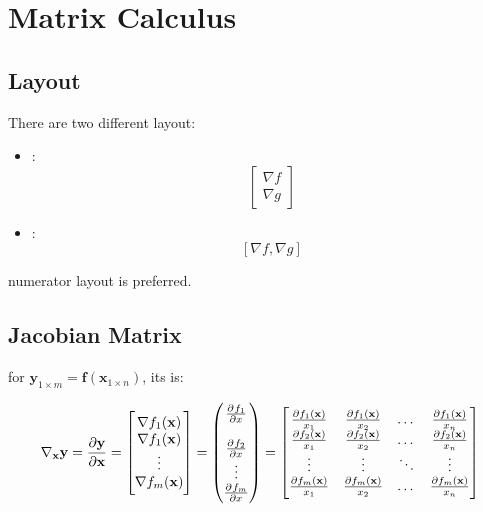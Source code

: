 \section{Matrix Calculus}

\subsection{Layout}


There are two different layout:

\begin{itemize}
	\item {}:
		\begin{equation}
		\left [
		\begin{matrix}
		\nabla f \\
		\nabla g
		\end{matrix}
		\right ]
		\end{equation}
	\item {}:
	\begin{equation}
	\left [
	\nabla f ,	\nabla g	\right ]
	\end{equation}
\end{itemize}

numerator layout is preferred.


\subsection{Jacobian Matrix}
for $\mathbf{y}_{1 \times m} = \mathbf{f}(\mathbf{x}_{1 \times n})$, its  is:

\begin{equation}
	\nabla{}_{\mathbf{x}} \mathbf{y} = 
\frac{\partial \mathbf{y}}{\partial \mathbf{x}} = \left [ \begin{matrix}
	\nabla f_1 (\mathbf{x}) \\
	\nabla f_1 (\mathbf{x}) \\
	\vdots \\
	\nabla f_m (\mathbf{x})  
\end{matrix} \right ] = \begin{pmatrix}
    \pd{f_1}{x} \\
    \\
    \pd{f_2}{x} \\
    \vdots \\
    \pd{f_m}{x} 
    \end{pmatrix} = \left [ \begin{matrix}
\frac{\partial f_1({\mathbf{x}})}{x_1} & \frac{\partial f_1({\mathbf{x}})}{x_2} & \dots & \frac{\partial f_1({\mathbf{x}})}{x_n} \\
\frac{\partial f_2({\mathbf{x}})}{x_1} & \frac{\partial f_2({\mathbf{x}})}{x_2} & \dots & \frac{\partial f_2({\mathbf{x}})}{x_n} \\
\vdots & \vdots & \ddots & \vdots  \\
\frac{\partial f_m({\mathbf{x}})}{x_1} & \frac{\partial f_m({\mathbf{x}})}{x_2} & \dots & \frac{\partial f_m({\mathbf{x}})}{x_n}
\end{matrix} \right ]
\end{equation}

